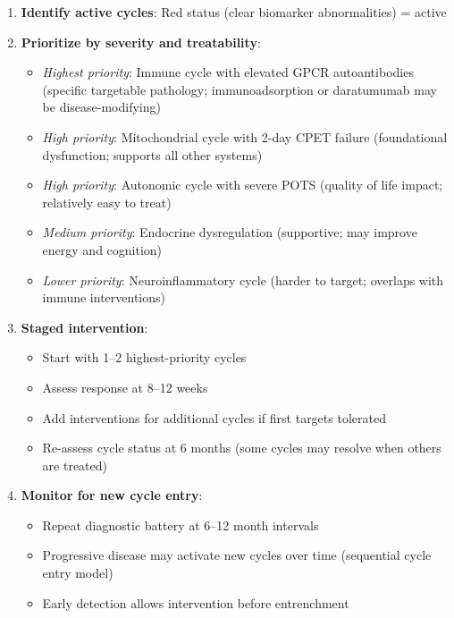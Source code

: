 \begin{enumerate}
    \item \textbf{Identify active cycles}: Red status (clear biomarker abnormalities) = active
    \item \textbf{Prioritize by severity and treatability}:
    \begin{itemize}
        \item \textit{Highest priority}: Immune cycle with elevated GPCR autoantibodies (specific targetable pathology; immunoadsorption or daratumumab may be disease-modifying)
        \item \textit{High priority}: Mitochondrial cycle with 2-day CPET failure (foundational dysfunction; supports all other systems)
        \item \textit{High priority}: Autonomic cycle with severe POTS (quality of life impact; relatively easy to treat)
        \item \textit{Medium priority}: Endocrine dysregulation (supportive; may improve energy and cognition)
        \item \textit{Lower priority}: Neuroinflammatory cycle (harder to target; overlaps with immune interventions)
    \end{itemize}

    \item \textbf{Staged intervention}:
    \begin{itemize}
        \item Start with 1--2 highest-priority cycles
        \item Assess response at 8--12 weeks
        \item Add interventions for additional cycles if first targets tolerated
        \item Re-assess cycle status at 6 months (some cycles may resolve when others are treated)
    \end{itemize}

    \item \textbf{Monitor for new cycle entry}:
    \begin{itemize}
        \item Repeat diagnostic battery at 6--12 month intervals
        \item Progressive disease may activate new cycles over time (sequential cycle entry model)
        \item Early detection allows intervention before entrenchment
    \end{itemize}
\end{enumerate}

